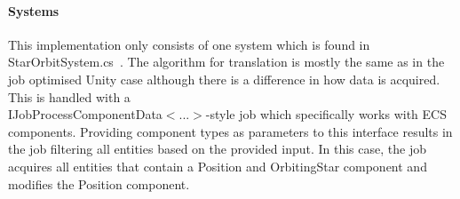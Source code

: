 \paragraph{Systems}
This implementation only consists of one system which is found in StarOrbitSystem.cs~\cite{orbitSystem}. The algorithm for translation is mostly the same as in the job optimised Unity case although there is a difference in how data is acquired. This is handled with a\\ IJobProcessComponentData$<$...$>$-style job which specifically works with ECS components. Providing component types as parameters to this interface results in the job filtering all entities based on the provided input. In this case, the job acquires all entities that contain a Position and OrbitingStar component and modifies the Position component. 
